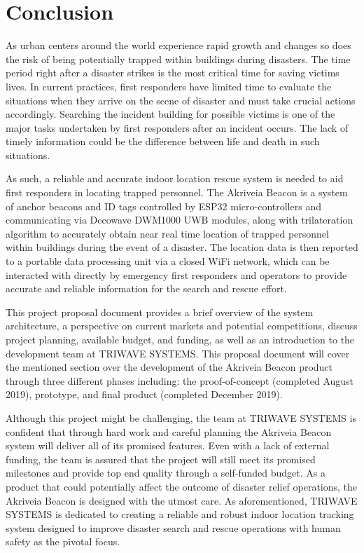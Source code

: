 

\setcounter{section}{6}
\section{Conclusion}
\bigskip
As urban centers around the world experience rapid growth and changes so does the risk of being potentially trapped within buildings during disasters. The time period right after a disaster strikes is the most critical time for saving victims lives. In current practices, first responders have limited time to evaluate the situations when they arrive on the scene of disaster and must take crucial actions accordingly. Searching the incident building for possible victims is one of the major tasks undertaken by first responders after an incident occurs. The lack of timely information could be the difference between life and death in such situations.

\bigskip
As such, a reliable and accurate indoor location rescue system is needed to aid first responders in locating trapped personnel. The Akriveia Beacon is a system of anchor beacons and ID tags controlled by ESP32 micro-controllers and communicating via Decowave DWM1000 UWB modules, along with trilateration algorithm to accurately obtain near real time location of trapped personnel within buildings during the event of a disaster. The location data is then reported to a portable data processing unit via a closed WiFi network, which can be interacted with directly by emergency first responders and operators to provide accurate and reliable information for the search and rescue effort. 

\bigskip
This project proposal document provides a brief overview of the system architecture, a perspective on current markets and potential competitions, discuss project planning, available budget, and funding, as well as an introduction to the development team at TRIWAVE SYSTEMS. This proposal document will cover the mentioned section over the development of the Akriveia Beacon product through three different phases including: the proof-of-concept (completed August 2019), prototype, and final product (completed December 2019).

\bigskip
Although this project might be challenging, the team at TRIWAVE SYSTEMS is confident that through hard work and careful planning the Akriveia Beacon system will deliver all of its promised features. Even with a lack of external funding, the team is assured that the project will still meet its promised milestones and provide top end quality through a self-funded budget. As a product that could potentially affect the outcome of disaster relief operations, the Akriveia Beacon is designed with the utmost care. As aforementioned, TRIWAVE SYSTEMS is dedicated to creating a reliable and robust indoor location tracking system designed to improve disaster search and rescue operations with human safety as the pivotal focus.



